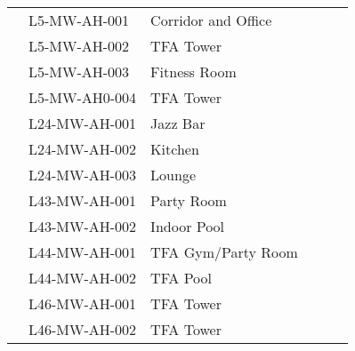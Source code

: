 \begin{table}[htbp]
\begin{tabular}{l l p{2.7cm} c c l}
\midrule
 \inc		 &L5-MW-AH-001	 &Corridor and Office	 	 &\checkmark &&\\
 \inc	 	 &L5-MW-AH-002	 &TFA Tower	 	  	 &\checkmark &&\\
 
 \inc	 	 &L5-MW-AH-003	 &Fitness Room	 	 &\checkmark &&\\
 \inc	 	 &L5-MW-AH0-004	 &TFA Tower 	 	  	 &\checkmark &&\\
 
\midrule

 \inc		& L24-MW-AH-001	& Jazz Bar	 	  &\checkmark &&\\
 \inc	 	 &L24-MW-AH-002	& Kitchen	 	  &\checkmark &&\\
 \inc	 	 &L24-MW-AH-003	& Lounge	 	  &\checkmark &&\\
\midrule
	 	 
 \inc		 &L43-MW-AH-001	 &Party Room	 	 &\checkmark &&\\
 \inc	 	 &L43-MW-AH-002	 &Indoor Pool	 	 &\checkmark &&\\	
\midrule

 \inc		 &L44-MW-AH-001	 &TFA Gym/Party Room &\checkmark &&\\
 \inc	 	 &L44-MW-AH-002	 &TFA Pool	 	  &\checkmark &&\\
\midrule
 \inc		 &L46-MW-AH-001	 &TFA Tower	 	 &\checkmark &&\\
 \inc	 	 &L46-MW-AH-002	 &TFA Tower	 	 &\checkmark &&\\
\bottomrule
\end{tabular}

\end{table}








